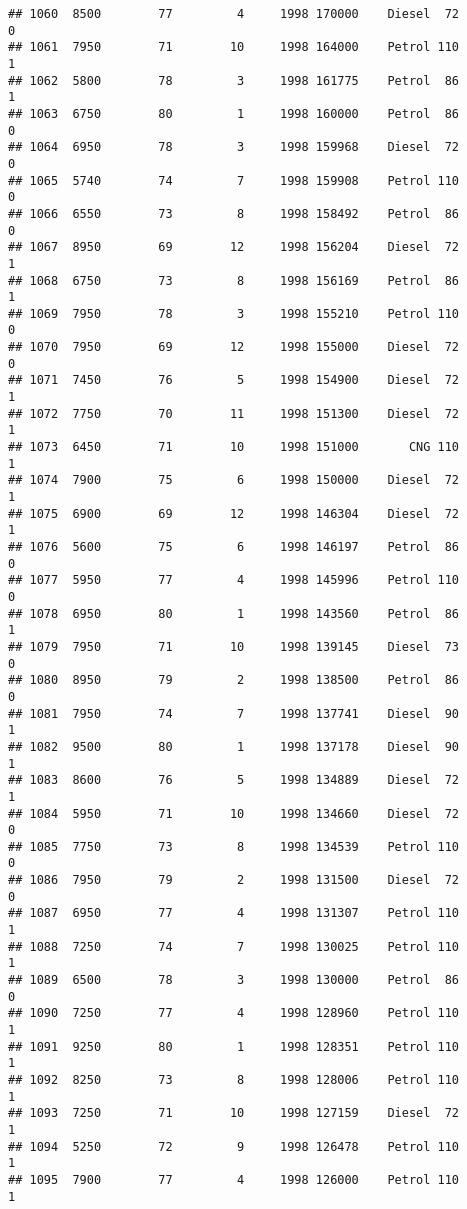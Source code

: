 \documentclass[]{article}
\begin{document}
\begin{verbatim}
## 1060  8500        77         4     1998 170000    Diesel  72         0
## 1061  7950        71        10     1998 164000    Petrol 110         1
## 1062  5800        78         3     1998 161775    Petrol  86         1
## 1063  6750        80         1     1998 160000    Petrol  86         0
## 1064  6950        78         3     1998 159968    Diesel  72         0
## 1065  5740        74         7     1998 159908    Petrol 110         0
## 1066  6550        73         8     1998 158492    Petrol  86         0
## 1067  8950        69        12     1998 156204    Diesel  72         1
## 1068  6750        73         8     1998 156169    Petrol  86         1
## 1069  7950        78         3     1998 155210    Petrol 110         0
## 1070  7950        69        12     1998 155000    Diesel  72         0
## 1071  7450        76         5     1998 154900    Diesel  72         1
## 1072  7750        70        11     1998 151300    Diesel  72         1
## 1073  6450        71        10     1998 151000       CNG 110         1
## 1074  7900        75         6     1998 150000    Diesel  72         1
## 1075  6900        69        12     1998 146304    Diesel  72         1
## 1076  5600        75         6     1998 146197    Petrol  86         0
## 1077  5950        77         4     1998 145996    Petrol 110         0
## 1078  6950        80         1     1998 143560    Petrol  86         1
## 1079  7950        71        10     1998 139145    Diesel  73         0
## 1080  8950        79         2     1998 138500    Petrol  86         0
## 1081  7950        74         7     1998 137741    Diesel  90         1
## 1082  9500        80         1     1998 137178    Diesel  90         1
## 1083  8600        76         5     1998 134889    Diesel  72         1
## 1084  5950        71        10     1998 134660    Diesel  72         0
## 1085  7750        73         8     1998 134539    Petrol 110         0
## 1086  7950        79         2     1998 131500    Diesel  72         0
## 1087  6950        77         4     1998 131307    Petrol 110         1
## 1088  7250        74         7     1998 130025    Petrol 110         1
## 1089  6500        78         3     1998 130000    Petrol  86         0
## 1090  7250        77         4     1998 128960    Petrol 110         1
## 1091  9250        80         1     1998 128351    Petrol 110         1
## 1092  8250        73         8     1998 128006    Petrol 110         1
## 1093  7250        71        10     1998 127159    Diesel  72         1
## 1094  5250        72         9     1998 126478    Petrol 110         1
## 1095  7900        77         4     1998 126000    Petrol 110         1

\end{verbatim}
\end{document}
